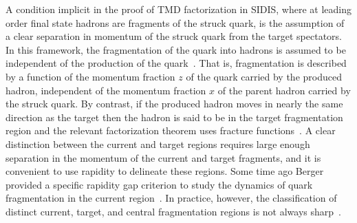 \documentclass[final,3p,times,onecolumn,sort&compress,hidelinks]{elsarticle}
\begin{document}
 
A condition implicit in the proof of TMD factorization in SIDIS,
where at leading order final state hadrons are fragments of the
struck quark, is the assumption of a clear separation in momentum
of the struck quark from the target spectators.  In this framework,
the fragmentation of the quark into hadrons is assumed to be
independent of the production of the quark~\cite{Berger:1987zu,
Trentadue:1993ka}.  That is, fragmentation is described by a function
of the momentum fraction $z$ of the quark carried by the produced
hadron, independent of the momentum fraction $x$ of the parent
hadron carried by the struck quark.
By contrast, if the produced hadron moves in nearly the same
direction as the target then the hadron is said to be in the target
fragmentation region and the relevant factorization theorem uses
fracture functions~\cite{Trentadue:1993ka, Grazzini:1997ih,
Anselmino:2011ss}.  A clear distinction between the current and
target regions requires large enough separation in the momentum
of the current and target fragments, and it is convenient to use
rapidity to delineate these regions.  Some time ago Berger
\cite{Berger:1987zu, Mulders:2000jt} provided a specific rapidity
gap criterion to study the dynamics of quark fragmentation in the
current region~\cite{Berger:1987zu, Mulders:2000jt}.  In practice,
however, the classification of distinct current, target, and central
fragmentation regions is not always sharp~\cite{Berger:1987zu,
Mulders:2000jt, Joosten:2013mia, Boglione:2016bph, Collins:2018teg}.
\end{document}
